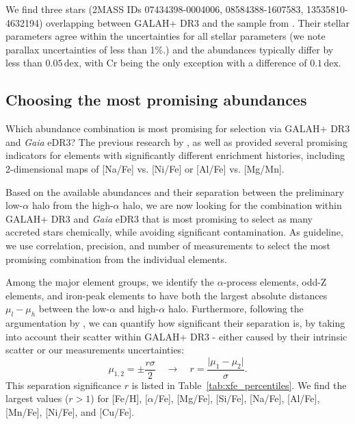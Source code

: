 \documentclass[fleqn,usenatbib]{mnras}
\newcommand{\dex}{\,\mathrm{dex}}	%
\newcommand{\Gaia}{\textit{Gaia}\xspace} %
\begin{document}
We find three stars (2MASS IDs 07434398-0004006, 08584388-1607583, 13535810-4632194) overlapping between GALAH+ DR3 and the sample from \citet{Nissen2010}. Their stellar parameters agree within the uncertainties for all stellar parameters (we note parallax uncertainties of less than 1\%.) and the abundances typically differ by less than $0.05\dex$, with Cr being the only exception with a difference of $0.1\dex$.

\subsection{Choosing the most promising abundances} \label{sec:choosing_chemical_selection}

Which abundance combination is most promising for selection via GALAH+ DR3 and \Gaia eDR3? The previous research by \citet{Nissen2010, Nissen2011}, \citet{Hawkins2015} as well as \citet{Hayes2018} provided several promising indicators for elements with significantly different enrichment histories, including 2-dimensional maps of [Na/Fe] vs. [Ni/Fe] or [Al/Fe] vs. [Mg/Mn].

Based on the available abundances and their separation between the preliminary low-$\alpha$ halo from the high-$\alpha$ halo, we are now looking for the combination within GALAH+ DR3 and \Gaia eDR3 that is most promising to select as many accreted stars chemically, while avoiding significant contamination. As guideline, we use correlation, precision, and number of measurements to select the most promising combination from the individual elements.

Among the major element groups, we identify the $\alpha$-process elements, odd-Z elements, and iron-peak elements to have both the largest absolute distances $\mu_l - \mu_h$ between the low-$\alpha$ and high-$\alpha$ halo. Furthermore, following the argumentation by \citet{Lindegren2013}, we can quantify how significant their separation is, by taking into account their scatter within GALAH+ DR3 - either caused by their intrinsic scatter or our measurements uncertainties: 
\begin{equation}
\mu_{1,2} = \pm \frac{r \sigma}{2} \quad \rightarrow \quad r = \frac{\vert \mu_1 - \mu_2 \vert}{\sigma}.
\end{equation}
This separation significance $r$ is listed in Table~\ref{tab:xfe_percentiles}. We find the largest values ($r > 1$) for [Fe/H], [$\alpha$/Fe], [Mg/Fe], [Si/Fe], [Na/Fe], [Al/Fe], [Mn/Fe], [Ni/Fe], and [Cu/Fe]. 
\end{document}
